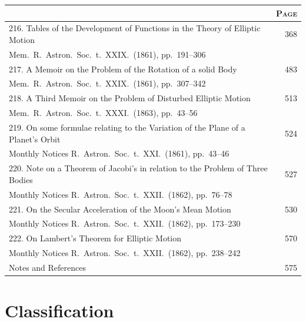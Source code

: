 \documentclass[11pt,a4paper]{book}
\begin{document}
\begin{longtable}{p{}r}
\toprule
\multicolumn{1}{c}{} & \multicolumn{1}{c}{\textsc{Page}} \\
\midrule
\endhead
216. Tables of the Development of Functions in the Theory of Elliptic Motion \dotfill & 368 \\
\multicolumn{2}{l}{\small Mem.\ R.\ Astron.\ Soc.\ t.~XXIX.\ (1861), pp.~191--306} \\[0.5em]
%
217. A Memoir on the Problem of the Rotation of a solid Body \dotfill & 483 \\
\multicolumn{2}{l}{\small Mem.\ R.\ Astron.\ Soc.\ t.~XXIX.\ (1861), pp.~307--342} \\[0.5em]
%
218. A Third Memoir on the Problem of Disturbed Elliptic Motion \dotfill & 513 \\
\multicolumn{2}{l}{\small Mem.\ R.\ Astron.\ Soc.\ t.~XXXI.\ (1863), pp.~43--56} \\[0.5em]
%
219. On some formulae relating to the Variation of the Plane of a Planet's Orbit \dotfill & 524 \\
\multicolumn{2}{l}{\small Monthly Notices R.\ Astron.\ Soc.\ t.~XXI.\ (1861), pp.~43--46} \\[0.5em]
%
220. Note on a Theorem of Jacobi's in relation to the Problem of Three Bodies \dotfill & 527 \\
\multicolumn{2}{l}{\small Monthly Notices R.\ Astron.\ Soc.\ t.~XXII.\ (1862), pp.~76--78} \\[0.5em]
%
221. On the Secular Acceleration of the Moon's Mean Motion \dotfill & 530 \\
\multicolumn{2}{l}{\small Monthly Notices R.\ Astron.\ Soc.\ t.~XXII.\ (1862), pp.~173--230} \\[0.5em]
%
222. On Lambert's Theorem for Elliptic Motion \dotfill & 570 \\
\multicolumn{2}{l}{\small Monthly Notices R.\ Astron.\ Soc.\ t.~XXII.\ (1862), pp.~238--242} \\[0.5em]
%
Notes and References \dotfill & 575 \\
\bottomrule
\end{longtable}

\clearpage

\section*{Classification}
\end{document}
